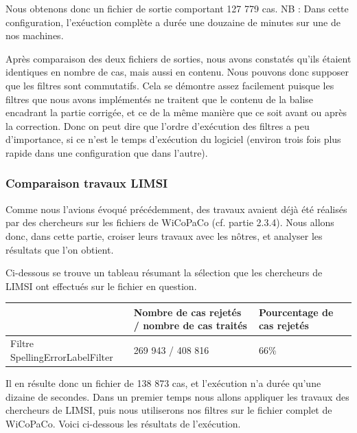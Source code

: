\documentclass[11pt]{article}
\begin{document}
Nous obtenons donc un fichier de sortie comportant 127 779 cas.
\newline
NB : Dans cette configuration, l'ex\'{e}uction compl\`{e}te a dur\'{e}e une douzaine de minutes sur une de nos machines.
\newline
\newline

Apr\`{e}s comparaison des deux fichiers de sorties, nous avons constat\'{e}s qu'ils \'{e}taient identiques en nombre de cas, mais aussi en contenu. Nous pouvons donc supposer que les filtres sont commutatifs.
Cela se d\'{e}montre assez facilement puisque les filtres que nous avons impl\'{e}ment\'{e}s ne traitent que le contenu de la balise encadrant la partie corrig\'{e}e, et ce de la m\^{e}me mani\`{e}re que ce soit avant ou apr\`{e}s la correction. Donc on peut dire que l'ordre d'ex\'{e}cution des filtres a peu d'importance, si ce n'est le temps d'ex\'{e}cution du logiciel (environ trois fois plus rapide dans une configuration que dans l'autre).


\subsubsection{Comparaison travaux LIMSI}
Comme nous l'avions \'{e}voqu\'{e} pr\'{e}c\'{e}demment, des travaux avaient d\'{e}j\`{a} \'{e}t\'{e} r\'{e}alis\'{e}s par des chercheurs sur les fichiers de WiCoPaCo (cf. partie 2.3.4). Nous allons donc, dans cette partie, croiser leurs travaux avec les n\^{o}tres, et analyser les r\'{e}sultats que l'on obtient.

Ci-dessous se trouve un tableau r\'{e}sumant la s\'{e}lection que les chercheurs de LIMSI ont effectu\'{e}s sur le fichier en question.
\begin{center}
\begin{tabular}{|M{4cm}|M{5cm}|M{6cm}|}
   \hline
    \, &Nombre de cas rejet\'{e}s / nombre de cas trait\'{e}s & Pourcentage de cas rejet\'{e}s \tabularnewline
   \hline
    Filtre SpellingErrorLabelFilter & 269 943 / 408 816 & 66\% \tabularnewline
   \hline
\end{tabular}
\end{center}
Il en r\'{e}sulte donc un fichier de 138 873 cas, et l'ex\'{e}cution n'a dur\'{e}e qu'une dizaine de secondes.
\newline
\newline
Dans un premier temps nous allons appliquer les travaux des chercheurs de LIMSI, puis nous utiliserons nos filtres sur le fichier complet de WiCoPaCo.
Voici ci-dessous les r\'{e}sultats de l'ex\'{e}cution.
\end{document}
